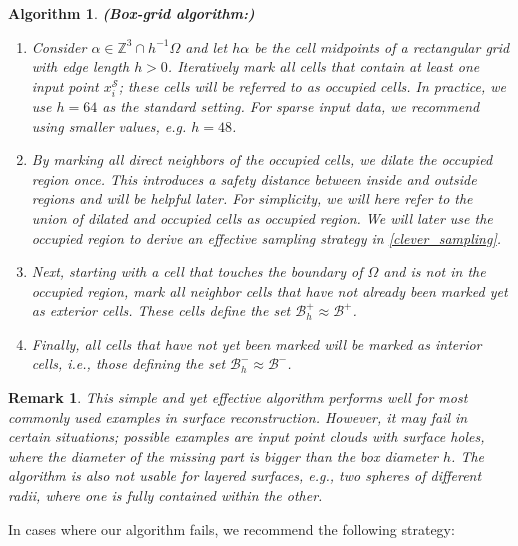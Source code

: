 \documentclass[12pt,openany]{book}
\def\S{\mathcal{S}}
\theoremstyle{plainnormal}
\newtheorem{remark}[theorem]{Remark}
\newtheorem{algorithm}[theorem]{Algorithm}
\theoremstyle{remark}
\begin{document}
\begin{algorithm}\textbf{(Box-grid algorithm:)}\label{box_algorithm}
\begin{enumerate}
    \item Consider $\alpha \in \mathbb{Z}^3\cap h^{-1}\Omega$ and let $h\alpha $ be the cell midpoints of a rectangular grid with edge length $h > 0$. Iteratively mark all cells that contain at least one input point $x_i^\S$; these cells will be referred to as \emph{occupied cells}. In practice, we use $h = 64$ as the standard setting. For sparse input data, we recommend using smaller values, e.g. $h = 48$.
    \item By marking all direct neighbors of the occupied cells, we dilate the occupied region once. This introduces a safety distance between inside and outside regions and will be helpful later. For simplicity, we will here refer to the union of dilated and occupied cells as \emph{occupied region}. We will later use the occupied region to derive an effective sampling strategy in \cref{clever_sampling}.
    \item Next, starting with a cell that touches the boundary of $\Omega$ and is not in the occupied region, mark all neighbor cells that have not already been marked yet as \emph{exterior cells}. These cells define the set $\mathcal{B}^+_h \approx \mathcal{B}^+$.
    \item Finally, all cells that have not yet been marked will be marked as \emph{interior cells}, i.e., those defining the set $\mathcal{B}_h^-\approx \mathcal{B}^-$.
    \end{enumerate}
\end{algorithm}
\begin{remark}
    This simple and yet effective algorithm performs well for most commonly used examples in surface reconstruction. However, it may fail in certain situations; possible examples are input point clouds with surface holes, where the diameter of the missing part is bigger than the box diameter $h$. The algorithm is also not usable for layered surfaces, e.g., two spheres of different radii, where one is fully contained within the other.
\end{remark}
    In cases where our algorithm fails, we recommend the following strategy: 
\end{document}
